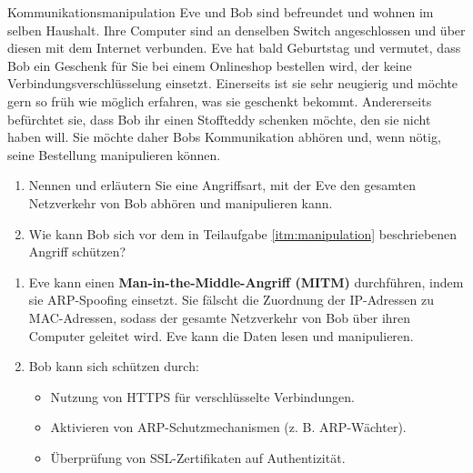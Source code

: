 \documentclass{article}
\begin{document}
\begin{exercise}{Kommunikationsmanipulation}
  Eve und Bob sind befreundet und wohnen im selben Haushalt. Ihre Computer sind an denselben Switch angeschlossen und über diesen mit dem Internet verbunden. Eve hat bald Geburtstag und vermutet, dass Bob ein Geschenk für Sie bei einem Onlineshop bestellen wird, der keine Verbindungsverschlüsselung einsetzt. Einerseits ist sie sehr neugierig und möchte gern so früh wie möglich erfahren, was sie geschenkt bekommt. Andererseits befürchtet sie, dass Bob ihr einen Stoffteddy schenken möchte, den sie nicht haben will. Sie möchte daher Bobs Kommunikation abhören und, wenn nötig, seine Bestellung manipulieren können.
  \begin{enumerate}
    \item\label{itm:manipulation} Nennen und erläutern Sie eine Angriffsart, mit der Eve den gesamten Netzverkehr von Bob abhören und manipulieren kann.
    \item Wie kann Bob sich vor dem in Teilaufgabe \ref{itm:manipulation} beschriebenen Angriff schützen?
  \end{enumerate}

  \begin{solution}
    \begin{enumerate}
        \item Eve kann einen \textbf{Man-in-the-Middle-Angriff (MITM)} durchführen, indem sie ARP-Spoofing einsetzt. Sie fälscht die Zuordnung der IP-Adressen zu MAC-Adressen, sodass der gesamte Netzverkehr von Bob über ihren Computer geleitet wird. Eve kann die Daten lesen und manipulieren.
        \item Bob kann sich schützen durch:
        \begin{itemize}
            \item Nutzung von HTTPS für verschlüsselte Verbindungen.
            \item Aktivieren von ARP-Schutzmechanismen (z. B. ARP-Wächter).
            \item Überprüfung von SSL-Zertifikaten auf Authentizität.
        \end{itemize}
    \end{enumerate}
  \end{solution}
\end{exercise}
\end{document}

